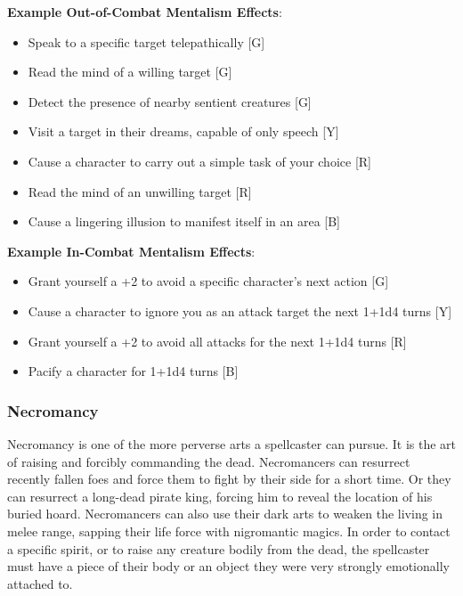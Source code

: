 \documentclass[oneside]{book}
\begin{document}
\begin{multicols}{2}
\textbf{Example Out-of-Combat Mentalism Effects}:
	\begin{itemize}
		\setlength{\itemsep}{0cm}%
  		\setlength{\parskip}{0cm}%
		\item{ \small Speak to a specific target telepathically [G]}
		\item{ \small Read the mind of a willing target [G]}
		\item{ \small Detect the presence of nearby sentient creatures [G]}
		\item{ \small Visit a target in their dreams, capable of only speech [Y]}
		\item{ \small Cause a character to carry out a simple task of your choice [R]}
		\item{ \small Read the mind of an unwilling target [R]}
		\item{ \small Cause a lingering illusion to manifest itself in an area [B]}
	\end{itemize}
	
\textbf{Example In-Combat Mentalism Effects}:
	\begin{itemize}
		\setlength{\itemsep}{0cm}%
  		\setlength{\parskip}{0cm}%
		\item{ \small Grant yourself a +2 to avoid a specific character's next action [G]}
		\item{ \small Cause a character to ignore you as an attack target the next 1+1d4 turns [Y]}
		\item{ \small Grant yourself a +2 to avoid all attacks for the next 1+1d4 turns [R]}
		\item{ \small Pacify a character for 1+1d4 turns [B]}
	\end{itemize}
	
	
\subsubsection{Necromancy}
Necromancy is one of the more perverse arts a spellcaster can pursue. It is the art of raising and forcibly commanding the dead. Necromancers can resurrect recently fallen foes and force them to fight by their side for a short time. Or they can resurrect a long-dead pirate king, forcing him to reveal the location of his buried hoard. Necromancers can also use their dark arts to weaken the living in melee range, sapping their life force with nigromantic magics. In order to contact a specific spirit, or to raise any creature bodily from the dead, the spellcaster must have a piece of their body or an object they were very strongly emotionally attached to.


\end{multicols}
\end{document}
